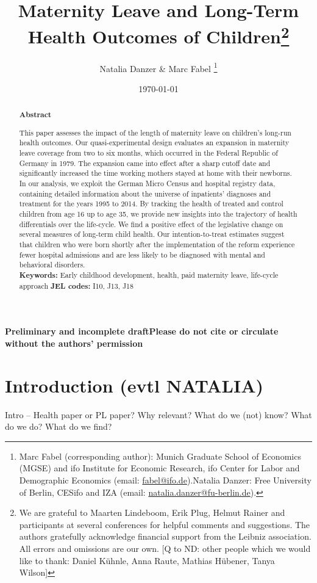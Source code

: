 \documentclass[11pt, a4paper]{article} %
\title{Maternity Leave and Long-Term Health Outcomes of Children\footnote{We are grateful to Maarten Lindeboom, Erik Plug, Helmut Rainer and participants at several conferences for helpful comments and suggestions. The authors gratefully acknowledge financial support from the Leibniz association. All errors and omissions are our own.
[Q to ND:  other people which we would like to thank: Daniel Kühnle, Anna Raute, Mathias Hübener, Tanya Wilson]}}
\author{Natalia Danzer \& Marc Fabel \thanks{Marc Fabel (corresponding author): Munich Graduate School of Economics (MGSE) and ifo Institute for Economic Research, ifo Center for Labor and Demographic Economics (email: \href{mailto:fabel@ifo.de}{fabel@ifo.de}).\newline Natalia Danzer: Free University of Berlin, CESifo and IZA (email: \href{mailto:natalia.danzer@fu-berlin.de}{natalia.danzer@fu-berlin.de}).}}
\date{\monthyeardate\today}
\begin{document}
\setcounter{page}{0}  
\tableofcontents
\newpage
\setcounter{page}{1}    
\maketitle

\textbf{\color{red} Preliminary and incomplete draft\newline Please do not cite or circulate without the authors' permission}
\renewcommand{\abstractname}{\vspace{-\baselineskip}} %

  \begin{abstract}\noindent 
   \footnotesize{\begin{center}\textbf{Abstract}\end{center} This paper assesses the impact of the length of maternity leave on children’s long-run health outcomes. Our quasi-experimental design evaluates an expansion in maternity leave coverage from two to six months, which occurred in the Federal Republic of Germany in 1979. The expansion came into effect after a sharp cutoff date and significantly increased the time working mothers stayed at home with their newborns. In our analysis, we exploit the German Micro Census and hospital registry data, containing detailed information about the universe of inpatients' diagnoses and treatment for the years 1995 to 2014. By tracking the health of treated and control children from age 16 up to age 35, we provide new insights into the trajectory of health differentials over the life-cycle.
   	We find a positive effect of the legislative change on several measures of long-term child health. Our intention-to-treat estimates suggest that children who were born shortly after the implementation of the reform experience fewer hospital admissions and are less likely to be diagnosed with mental and behavioral disorders.\\\newline \textbf{Keywords:} Early childhood development, health, paid maternity leave, life-cycle approach \newline \textbf{JEL codes:} I10, J13, J18}
    \end{abstract}

\newpage


\section{Introduction (evtl NATALIA)}\label{sec:introduction}
Intro –
Health paper or PL paper?
Why relevant?
What do we (not) know?
What do we do?
What do we find?
 
\end{document}
